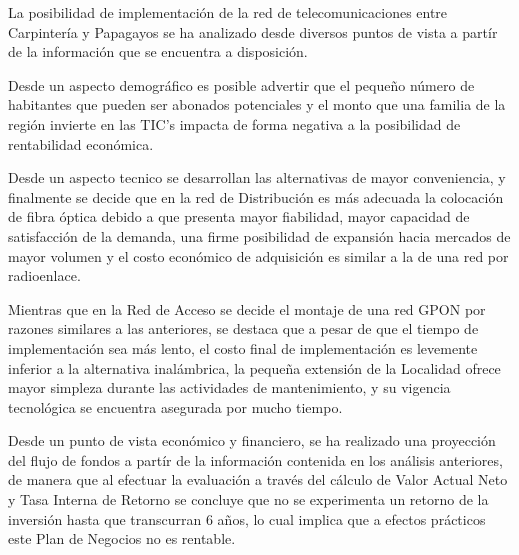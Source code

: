 















La posibilidad de implementación de la red de telecomunicaciones entre Carpintería
y Papagayos se ha analizado desde diversos puntos de vista a partír de la información
que se encuentra a disposición. 

Desde un aspecto demográfico es posible advertir que el pequeño número de habitantes que 
pueden ser abonados potenciales y el monto que una familia de la región
invierte en las TIC's impacta de forma negativa a la posibilidad de rentabilidad
económica. 

Desde un aspecto tecnico se desarrollan las alternativas de mayor conveniencia, y 
finalmente se decide que en la red de Distribución 
es más adecuada la colocación de fibra óptica debido a que presenta mayor
fiabilidad, mayor capacidad de satisfacción de la demanda, una firme posibilidad de expansión
hacia mercados de mayor volumen y el costo económico de adquisición es similar a la de una 
red por radioenlace. 

Mientras que en la Red de Acceso se decide el montaje de una red GPON 
por razones similares a las anteriores, se destaca que a pesar de que el tiempo de
implementación sea más lento, el costo final de implementación
es levemente inferior a la alternativa inalámbrica, la pequeña extensión de la Localidad ofrece
mayor simpleza durante las actividades de mantenimiento, y su vigencia tecnológica se encuentra
asegurada por mucho tiempo.

Desde un punto de vista económico y financiero, se ha realizado una proyección del flujo
de fondos a partír de la información contenida en los análisis anteriores, de manera que
al efectuar la evaluación a través del cálculo de Valor Actual Neto y Tasa Interna de Retorno
se concluye que no se experimenta un retorno de la inversión 
hasta que transcurran 6 años, lo cual implica que a efectos prácticos este Plan de Negocios no
es rentable.
